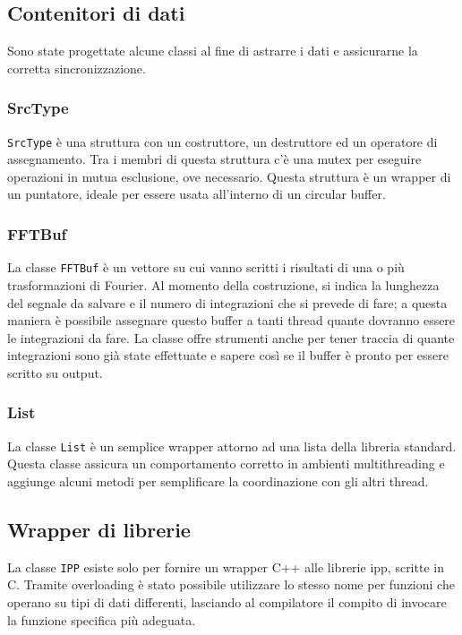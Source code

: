 \subsection{Contenitori di dati}
Sono state progettate alcune classi al fine di astrarre i dati e assicurarne la corretta sincronizzazione.
\subsubsection{SrcType}
\texttt{SrcType} \`e una struttura con un costruttore, un destruttore ed un operatore di assegnamento. Tra i membri di questa struttura c'\`e una mutex per eseguire operazioni in mutua esclusione, ove necessario. Questa struttura \`e un wrapper di un puntatore, ideale per essere usata all'interno di un circular buffer.
\subsubsection{FFTBuf}
La classe \texttt{FFTBuf} \`e un vettore su cui vanno scritti i risultati di una o pi\`u trasformazioni di Fourier. Al momento della costruzione, si indica la lunghezza del segnale da salvare e il numero di integrazioni che si prevede di fare; a questa maniera \`e possibile assegnare questo buffer a tanti thread quante dovranno essere le integrazioni da fare. La classe offre strumenti anche per tener traccia di quante integrazioni sono già state effettuate e sapere cos\`i se il buffer \`e pronto per essere scritto su output.
\subsubsection{List}
La classe \texttt{List} \`e un semplice wrapper attorno ad una lista della libreria standard. Questa classe assicura un comportamento corretto in ambienti multithreading e aggiunge alcuni metodi per semplificare la coordinazione con gli altri thread.
\subsection{Wrapper di librerie}
La classe \texttt{IPP} esiste solo per fornire un wrapper C++ alle librerie \ac{ipp}, scritte in C. Tramite overloading \`e stato possibile utilizzare lo stesso nome per funzioni che operano su tipi di dati differenti, lasciando al compilatore il compito di invocare la funzione specifica pi\`u adeguata.
